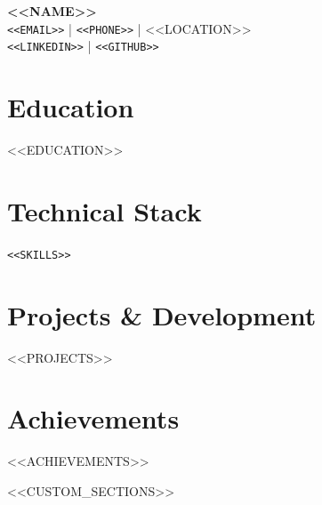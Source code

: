 \documentclass[11pt,a4paper]{article}
\begin{document}
\begin{center}
{\Huge\bfseries\color{codegray} <<NAME>>}\\[0.3cm]
{\large\texttt{<<EMAIL>>} | \texttt{<<PHONE>>} | <<LOCATION>>}\\[0.2cm]
{\large\texttt{<<LINKEDIN>>} | \texttt{<<GITHUB>>}}
\end{center}

\vspace{0.5cm}

\section{Education}
<<EDUCATION>>

\section{Technical Stack}
\texttt{<<SKILLS>>}

\section{Projects \& Development}
<<PROJECTS>>

\section{Achievements}
\begin{itemize}[leftmargin=*]
<<ACHIEVEMENTS>>
\end{itemize}

<<CUSTOM_SECTIONS>>
\end{document}
